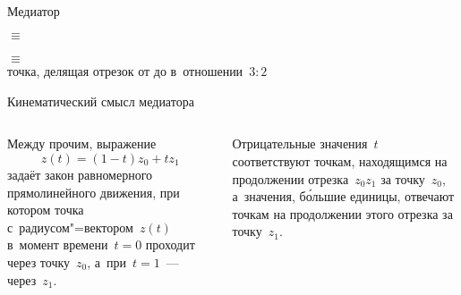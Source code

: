 \begin{frame}{Медиатор}
\begin{center}
\LARGE
{}\quad$\equiv$\quad{}\\[3ex]
\\
$\equiv$\\
{\normalsize точка, делящая отрезок от  до 
в~отношении~$3:2$}
\end{center}
\end{frame}

\begin{frame}{Кинематический смысл медиатора}
\begin{columns}
Между прочим, выражение
	\[
	z(t)=(1-t)z_0+tz_1
	\]
задаёт закон равномерного прямолинейного движения, при котором точка
с~радиусом"=вектором~$z(t)$ в~момент времени~$t=0$ проходит через точку~$z_0$,
а~при~$t=1$~— через~$z_1$.

\bigskip
Отрицательные значения~$t$ соответствуют точкам, находящимся на продолжении
отрезка~$z_0z_1$ за точку~$z_0$, а~значения, бо́льшие единицы, отвечают точкам
на продолжении этого отрезка за точку~$z_1$.
\end{columns}
\end{frame}
